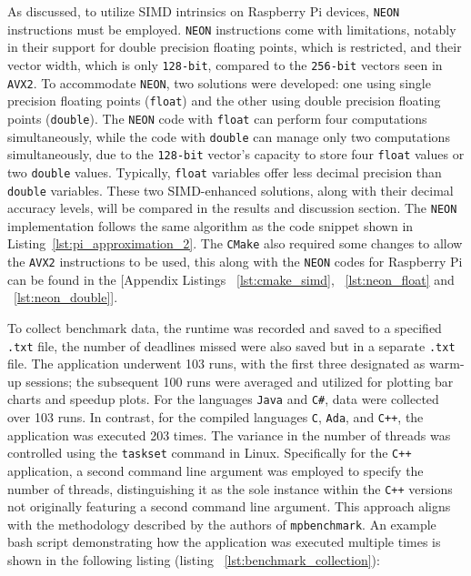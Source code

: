 As discussed, to utilize SIMD intrinsics on Raspberry Pi devices, \texttt{NEON} instructions must be employed. \texttt{NEON} instructions come with limitations, notably in their support for double precision floating points, which is restricted, and their vector width, which is only \texttt{128-bit}, compared to the \texttt{256-bit} vectors seen in \texttt{AVX2}\cite{neon_reference}. To accommodate \texttt{NEON}, two solutions were developed: one using single precision floating points (\texttt{float}) and the other using double precision floating points (\texttt{double}). The \texttt{NEON} code with \texttt{float} can perform four computations simultaneously, while the code with \texttt{double} can manage only two computations simultaneously, due to the \texttt{128-bit} vector's capacity to store four \texttt{float} values or two \texttt{double} values. Typically, \texttt{float} variables offer less decimal precision than \texttt{double} variables. These two SIMD-enhanced solutions, along with their decimal accuracy levels, will be compared in the results and discussion section. The \texttt{NEON} implementation follows the same algorithm as the code snippet shown in Listing~\ref{lst:pi_approximation_2}. The \texttt{CMake} also required some changes to allow the \texttt{AVX2} instructions to be used, this along with the \texttt{NEON} codes for Raspberry Pi can be found in the [Appendix Listings ~\ref{lst:cmake_simd}, ~\ref{lst:neon_float} and ~\ref{lst:neon_double}].

To collect benchmark data, the runtime was recorded and saved to a specified \texttt{.txt} file, the number of deadlines missed were also saved but in a separate \texttt{.txt} file. The application underwent 103 runs, with the first three designated as warm-up sessions; the subsequent 100 runs were averaged and utilized for plotting bar charts and speedup plots. For the languages \texttt{Java} and \texttt{C\#}, data were collected over 103 runs. In contrast, for the compiled languages \texttt{C}, \texttt{Ada}, and \texttt{C++}, the application was executed 203 times. The variance in the number of threads was controlled using the \texttt{taskset} command in Linux. Specifically for the \texttt{C++} application, a second command line argument was employed to specify the number of threads, distinguishing it as the sole instance within the \texttt{C++} versions not originally featuring a second command line argument. This approach aligns with the methodology described by the authors of \texttt{mpbenchmark}\cite{mpbenchmark_paper}. An example bash script demonstrating how the application was executed multiple times is shown in the following listing (listing ~\ref{lst:benchmark_collection}):

